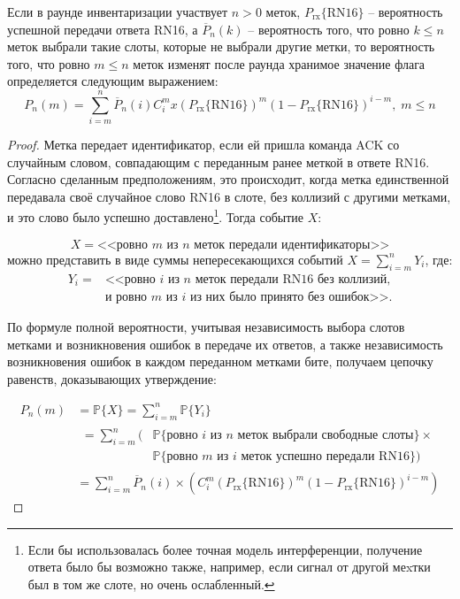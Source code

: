\begin{prop}\label{prop:ch3_pnm}
	Если в раунде инвентаризации участвует $n > 0$ меток, $P_\text{rx}\{\text{RN16}\}$ -- вероятность успешной передачи ответа RN16, а $\overline{P}_n(k)$ -- вероятность того, что ровно $k \leqslant n$ меток выбрали такие слоты, которые не выбрали другие метки, то вероятность того, что ровно $m \leqslant n$ меток изменят после раунда хранимое значение флага определяется следующим выражением:
	\begin{equation}\label{eq:ch3_pnm}
		P_n(m) = \sum\limits_{i=m}^{n}\overline{P}_n(i) C_i^mx \left(P_\text{rx}\{\text{RN16}\}\right)^m
			\left(1 - P_\text{rx}\{\text{RN16}\}\right)^{i - m},\; m \leqslant n
	\end{equation}
\end{prop}
\begin{proof}
	Метка передает идентификатор, если ей пришла команда ACK со случайным словом, совпадающим с переданным ранее меткой в ответе RN16. Согласно сделанным предположениям, это происходит, когда метка единственной передавала своё случайное слово RN16 в слоте, без коллизий с другими метками, и это слово было успешно доставлено\footnote{Если бы использовалась более точная модель интерференции, получение ответа было бы возможно также, например, если сигнал от другой меxтки был в том же слоте, но очень ослабленный.}. Тогда событие $X$:

	$$
	X = \text{<<ровно $m$ из $n$ меток передали идентификаторы>>}
	$$
	можно представить в виде суммы непересекающихся событий $X = \sum\limits_{i=m}^n Y_i$, где:
	$$
	\begin{aligned}
	Y_i = &\text{<<ровно $i$ из $n$ меток передали RN16 без коллизий,}\\
		  &\text{и ровно $m$ из $i$ из них было принято без ошибок>>}.
	\end{aligned}
	$$

	По формуле полной вероятности, учитывая независимость выбора слотов метками и возникновения ошибок в передаче их ответов, а также независимость возникновения ошибок в каждом переданном метками бите, получаем цепочку равенств, доказывающих утверждение:

	\begin{align*}
		P_n(m) &= \mathbb{P}\{X\} = \sum\limits_{i=m}^{n} \mathbb{P}\{Y_i\}\\
		&\begin{aligned}= \sum\limits_{i=m}^{n}(
			&\mathbb{P}\{\text{ровно $i$ из $n$ меток выбрали свободные слоты}\} \times\\
			& \mathbb{P}\{\text{ровно $m$ из $i$ меток успешно передали RN16}\})
			\end{aligned}\\
		&=\sum\limits_{i=m}^{n} \overline{P}_n(i) \times \left(C_i^m(P_\text{rx}\{\text{RN16}\})^m
			(1 - P_\text{rx}\{\text{RN16}\})^{i - m}\right)
	\end{align*}

\end{proof}

